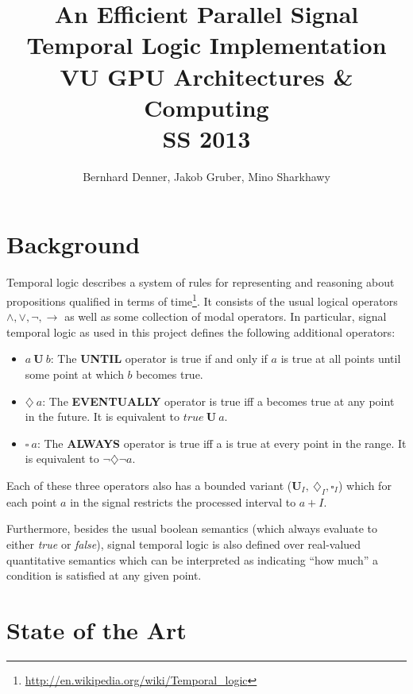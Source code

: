 \documentclass[a4paper,10pt]{article}
\title{
	An Efficient Parallel Signal Temporal Logic Implementation \\
    VU GPU Architectures \& Computing \\
    SS 2013
}
\author{
    Bernhard Denner,
    Jakob Gruber,
    Mino Sharkhawy
}
\renewcommand{\And}{\wedge}
\newcommand{\Or}{\vee}
\newcommand{\Neg}{\neg}
\newcommand{\Impl}{\rightarrow}
\newcommand{\Until}{\mathbf{U}}
\newcommand{\Evtl}{\diamondsuit}
\newcommand{\Alw}{\square}
\newcommand{\Buntil}{\mathbf{U}_I}
\newcommand{\Bevtl}{\diamondsuit_I}
\newcommand{\Balw}{\square_I}
\begin{document}
\begin{comment}
Problem statement, State of the art (semantics, ...), Sequential algorithms, Parallel ..., Test cases, benchmarks, How the project went, what we did.
\end{comment}

\maketitle
\pagebreak
\tableofcontents
\pagebreak

\section{Background}

Temporal logic describes a system of rules for representing and reasoning about propositions
qualified in terms of time\footnote{\url{http://en.wikipedia.org/wiki/Temporal_logic}}.
It consists of the usual logical operators $\And, \Or, \Neg, \Impl$ as well as
some collection of modal operators. In particular, signal temporal logic as used in this
project defines the following additional operators:

\begin{itemize}
\item $a \: \Until \: b$: The \textbf{UNTIL} operator is true if and only if $a$ is true
      at all points until some point at which $b$ becomes true.
\item $\Evtl \: a$: The \textbf{EVENTUALLY} operator is true iff a becomes true at any point
      in the future. It is equivalent to $\mathit{true} \: \Until \: a$.
\item $\Alw \: a$: The \textbf{ALWAYS} operator is true iff a is true at every point in the range.
      It is equivalent to $\neg \Evtl \neg a$.
\end{itemize}

Each of these three operators also has a bounded variant ($\Buntil, \: \Bevtl, \Balw$) which
for each point $a$ in the signal restricts the processed interval to $a + I$.

Furthermore, besides the usual boolean semantics (which always evaluate to either \textit{true} or
\textit{false}), signal temporal logic is also defined over real-valued quantitative semantics which
can be interpreted as indicating ``how much'' a condition is satisfied at any given point.

\section{State of the Art} \label{sec:stateoftheart}
\end{document}
